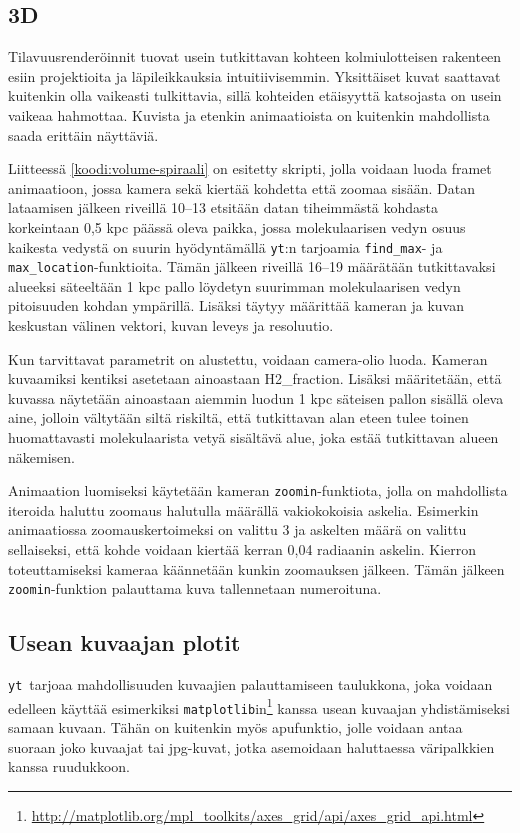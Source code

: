 \documentclass[12pt,a4paper]{article}
\newcommand{\yt}{\texttt{yt}}
\begin{document}

\subsection{3D}
Tilavuusrenderöinnit tuovat usein tutkittavan kohteen kolmiulotteisen rakenteen esiin projektioita ja läpileikkauksia intuitiivisemmin. Yksittäiset kuvat saattavat kuitenkin olla vaikeasti tulkittavia, sillä kohteiden etäisyyttä katsojasta on usein vaikeaa hahmottaa. Kuvista ja etenkin animaatioista on kuitenkin mahdollista saada erittäin näyttäviä. 

Liitteessä \ref{koodi:volume-spiraali} on esitetty skripti, jolla voidaan luoda framet animaatioon, jossa kamera sekä kiertää kohdetta että zoomaa sisään. Datan lataamisen jälkeen riveillä 10--13 etsitään datan tiheimmästä kohdasta korkeintaan 0,5 kpc päässä oleva paikka, jossa molekulaarisen vedyn osuus kaikesta vedystä on suurin hyödyntämällä \yt :n tarjoamia \texttt{find\_max}- ja \texttt{max\_location}-funktioita. Tämän jälkeen riveillä 16--19 määrätään tutkittavaksi alueeksi säteeltään 1 kpc pallo löydetyn suurimman molekulaarisen vedyn pitoisuuden kohdan ympärillä. Lisäksi täytyy määrittää kameran ja kuvan keskustan välinen vektori, kuvan leveys ja resoluutio. 

Kun tarvittavat parametrit on alustettu, voidaan camera-olio luoda. Kameran kuvaamiksi kentiksi asetetaan ainoastaan H2\_fraction. Lisäksi määritetään, että kuvassa näytetään ainoastaan aiemmin luodun 1 kpc säteisen pallon sisällä oleva aine, jolloin vältytään siltä riskiltä, että tutkittavan alan eteen tulee toinen huomattavasti molekulaarista vetyä sisältävä alue, joka estää tutkittavan alueen näkemisen.

Animaation luomiseksi käytetään kameran \texttt{zoomin}-funktiota, jolla on mahdollista iteroida haluttu zoomaus halutulla määrällä vakiokokoisia askelia. Esimerkin animaatiossa zoomauskertoimeksi on valittu 3 ja askelten määrä on valittu sellaiseksi, että kohde voidaan kiertää kerran 0,04 radiaanin askelin. Kierron toteuttamiseksi kameraa käännetään kunkin zoomauksen jälkeen. Tämän jälkeen \texttt{zoomin}-funktion palauttama kuva tallennetaan numeroituna.


\subsection{Usean kuvaajan plotit}
\yt\ tarjoaa mahdollisuuden kuvaajien palauttamiseen taulukkona, joka voidaan edelleen käyttää esimerkiksi \texttt{matplotlib}in\footnote{\url{http://matplotlib.org/mpl_toolkits/axes_grid/api/axes_grid_api.html}} kanssa usean kuvaajan yhdistämiseksi samaan kuvaan. Tähän on kuitenkin myös apufunktio, jolle voidaan antaa suoraan joko kuvaajat tai jpg-kuvat, jotka asemoidaan haluttaessa väripalkkien kanssa ruudukkoon.
\end{document}
